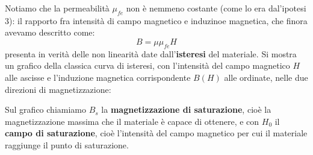 \documentclass[a4paper,11pt]{article}
\begin{document}
Notiamo che la permeabilità $\mu_{fe}$ non è nemmeno costante (come lo era dal'ipotesi 3): il rapporto fra intensità di campo magnetico e induzinoe magnetica, che finora avevamo descritto come:
$$
B = \mu \mu_{fe} H
$$
presenta in verità delle non linearità date dall'\textbf{isteresi} del materiale.
Si mostra un grafico della classica curva di isteresi, con l'intensità del campo magnetico $H$ alle ascisse e l'induzione magnetica corrispondente $B(H)$ alle ordinate, nelle due direzioni di magnetizzazione:

\begin{center}
\end{center}

Sul grafico chiamiamo $B_s$ la \textbf{magnetizzazione di saturazione}, cioè la magnetizzazione massima che il materiale è capace di ottenere, e con $H_0$ il \textbf{campo di saturazione}, cioè l'intensità del campo magnetico per cui il materiale raggiunge il punto di saturazione. 
\end{document}
